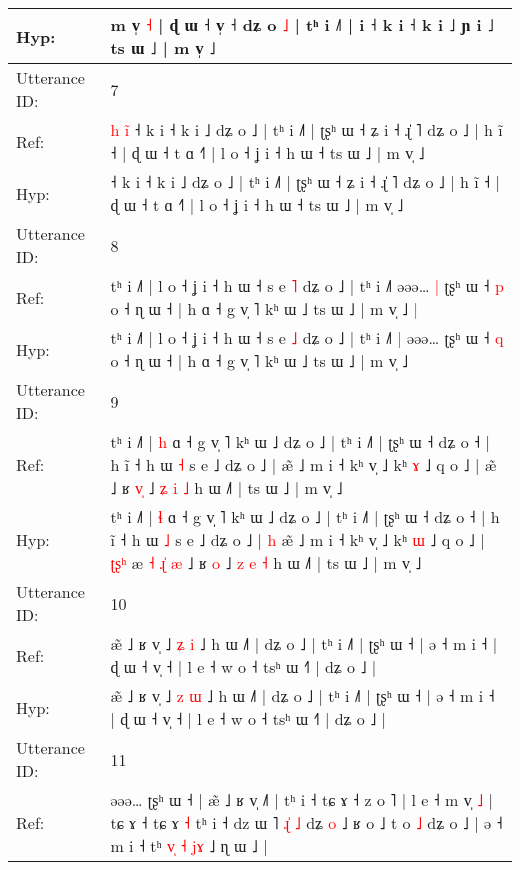 \documentclass[10pt]{article}
\DeclareRobustCommand{\hl}[1]{{\textcolor{red}{#1}}}
\begin{document}
\begin{longtable}{ll}
 \\
Hyp: & m v̩ \hl{}\hl{˧} | ɖ ɯ ˧ v̩ ˧ dʑ o \hl{˩} | tʰ i ˩˥ |\hl{}\hl{} i\hl{} ˧ k i ˧ k i ˩ ɲ i ˩ ts ɯ ˩ | m v̩ ˩
 \\
\midrule
Utterance ID: & 7 \\
Ref: & \hl{h}\hl{ }\hl{i}\hl{̃}\hl{ }˧ k i ˧ k i ˩ dʑ o ˩ | tʰ i ˩˥ | ʈʂʰ ɯ ˧ ʑ i ˧ ɻ̍ ˥ dʑ o ˩ | h ĩ ˧ | ɖ ɯ ˧ t ɑ ˧˥ | l o ˧ ʝ i ˧ h ɯ ˧ ts ɯ ˩ | m v̩ ˩
 \\
Hyp: & \hl{}\hl{}\hl{}\hl{}\hl{}˧ k i ˧ k i ˩ dʑ o ˩ | tʰ i ˩˥ | ʈʂʰ ɯ ˧ ʑ i ˧ ɻ̍ ˥ dʑ o ˩ | h ĩ ˧ | ɖ ɯ ˧ t ɑ ˧˥ | l o ˧ ʝ i ˧ h ɯ ˧ ts ɯ ˩ | m v̩ ˩
 \\
\midrule
Utterance ID: & 8 \\
Ref: & tʰ i ˩˥ | l o ˧ ʝ i ˧ h ɯ ˧ s e \hl{˥} dʑ o ˩ | tʰ i ˩˥\hl{}\hl{} əəə…\hl{ }\hl{|} ʈʂʰ ɯ ˧ \hl{p} o ˧ ɳ ɯ ˧ | h ɑ ˧ g v̩ ˥ kʰ ɯ ˩ ts ɯ ˩ | m v̩ ˩\hl{ }\hl{|}
 \\
Hyp: & tʰ i ˩˥ | l o ˧ ʝ i ˧ h ɯ ˧ s e \hl{˩} dʑ o ˩ | tʰ i ˩˥\hl{ }\hl{|} əəə…\hl{}\hl{} ʈʂʰ ɯ ˧ \hl{q} o ˧ ɳ ɯ ˧ | h ɑ ˧ g v̩ ˥ kʰ ɯ ˩ ts ɯ ˩ | m v̩ ˩\hl{}\hl{}
 \\
\midrule
Utterance ID: & 9 \\
Ref: & tʰ i ˩˥ | \hl{h} ɑ ˧ g v̩ ˥ kʰ ɯ ˩ dʑ o ˩ | tʰ i ˩˥ | ʈʂʰ ɯ ˧ dʑ o ˧ | h ĩ ˧ h ɯ \hl{˧} s e ˩ dʑ o ˩ |\hl{}\hl{} æ̃ ˩ m i ˧ kʰ v̩ ˩ kʰ \hl{ɤ} ˩ q o ˩ |\hl{}\hl{}\hl{}\hl{} æ\hl{}\hl{}\hl{}\hl{}\hl{}\hl{}\hl{̃} ˩ ʁ \hl{v}\hl{̩} ˩ \hl{ʑ} \hl{i} \hl{˩} h ɯ ˩˥ | ts ɯ ˩ | m v̩ ˩
 \\
Hyp: & tʰ i ˩˥ | \hl{ɬ} ɑ ˧ g v̩ ˥ kʰ ɯ ˩ dʑ o ˩ | tʰ i ˩˥ | ʈʂʰ ɯ ˧ dʑ o ˧ | h ĩ ˧ h ɯ \hl{˩} s e ˩ dʑ o ˩ |\hl{ }\hl{h} æ̃ ˩ m i ˧ kʰ v̩ ˩ kʰ \hl{ɯ} ˩ q o ˩ |\hl{ }\hl{ʈ}\hl{ʂ}\hl{ʰ} æ\hl{ }\hl{˧}\hl{ }\hl{ɻ}\hl{̍}\hl{ }\hl{æ} ˩ ʁ \hl{}\hl{o} ˩ \hl{z} \hl{e} \hl{˧} h ɯ ˩˥ | ts ɯ ˩ | m v̩ ˩
 \\
\midrule
Utterance ID: & 10 \\
Ref: & æ̃ ˩ ʁ v̩ ˩ \hl{ʑ} \hl{i} ˩ h ɯ ˩˥ | dʑ o ˩ | tʰ i ˩˥ | ʈʂʰ ɯ ˧ | ə ˧ m i ˧ | ɖ ɯ ˧ v̩ ˧ | l e ˧ w o ˧ tsʰ ɯ ˧˥ | dʑ o ˩ |
 \\
Hyp: & æ̃ ˩ ʁ v̩ ˩ \hl{z} \hl{ɯ} ˩ h ɯ ˩˥ | dʑ o ˩ | tʰ i ˩˥ | ʈʂʰ ɯ ˧ | ə ˧ m i ˧ | ɖ ɯ ˧ v̩ ˧ | l e ˧ w o ˧ tsʰ ɯ ˧˥ | dʑ o ˩ |
 \\
\midrule
Utterance ID: & 11 \\
Ref: & əəə… ʈʂʰ ɯ ˧ | æ\hl{̃} ˩ ʁ v̩ ˩˥ | tʰ i ˧ tɕ ɤ ˧ z o ˥ | l e ˧ m v̩\hl{ }\hl{˩} | tɕ ɤ ˧ tɕ ɤ\hl{}\hl{} \hl{˧} tʰ i ˧ dz ɯ ˥\hl{ }\hl{ɻ}\hl{̍}\hl{ }\hl{˩} dʑ \hl{o} ˩ ʁ o ˩ t o \hl{˩} dʑ o ˩ | ə ˧ m i ˧ tʰ\hl{ }\hl{v}\hl{̩}\hl{ }\hl{˧} \hl{j}\hl{ɤ} ˩ ɳ ɯ ˩ |

\end{longtable}
\end{document}
